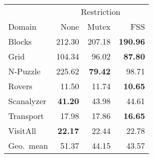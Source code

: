 \begin{tabular}{lrrr}
    & \multicolumn{3}{c}{Restriction} \\
    \cmidrule(lr){2-4}
    Domain & None & Mutex & FSS \\
    \midrule
    Blocks & 212.30 & 207.18 & \textbf{190.96} \\
    Grid & 104.34 & 96.02 & \textbf{87.80} \\
    N-Puzzle & 225.62 & \textbf{79.42} & 98.71 \\
    Rovers & 11.50 & 11.74 & \textbf{10.65} \\
    Scanalyzer & \textbf{41.20} & 43.98 & 44.61 \\
    Transport & 17.98 & 17.86 & \textbf{16.65} \\
    VisitAll & \textbf{22.17} & 22.44 & 22.78 \\ 
    \midrule
    Geo.~mean & 51.37 & 44.15 & 43.57 \\ 
\end{tabular}
